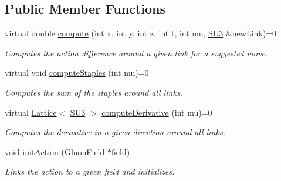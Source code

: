 \subsection*{Public Member Functions}
\begin{DoxyCompactItemize}
\item 
virtual double \hyperlink{classAction_ac0ea0d66e3ee4c7bdf0b478e613e5981}{compute} (int x, int y, int z, int t, int mu, \hyperlink{structSU3}{S\+U3} \&new\+Link)=0\hypertarget{classAction_ac0ea0d66e3ee4c7bdf0b478e613e5981}{}\label{classAction_ac0ea0d66e3ee4c7bdf0b478e613e5981}

\begin{DoxyCompactList}\small\item\em Computes the action difference around a given link for a suggested move. \end{DoxyCompactList}\item 
virtual void \hyperlink{classAction_ad6c5003169695d5cba0f69580040db50}{compute\+Staples} (int mu)=0\hypertarget{classAction_ad6c5003169695d5cba0f69580040db50}{}\label{classAction_ad6c5003169695d5cba0f69580040db50}

\begin{DoxyCompactList}\small\item\em Computes the sum of the staples around all links. \end{DoxyCompactList}\item 
virtual \hyperlink{classLattice}{Lattice}$<$ \hyperlink{structSU3}{S\+U3} $>$ \hyperlink{classAction_a722e4f88dda82440d0c6e19a43972b21}{compute\+Derivative} (int mu)=0\hypertarget{classAction_a722e4f88dda82440d0c6e19a43972b21}{}\label{classAction_a722e4f88dda82440d0c6e19a43972b21}

\begin{DoxyCompactList}\small\item\em Computes the derivative in a given direction around all links. \end{DoxyCompactList}\item 
void \hyperlink{classAction_a3c4e7cbcf64ae134fa86afd5d156b12b}{init\+Action} (\hyperlink{field_8h_afe80b127697eba6d6e7fbd8121c8d4ee}{Gluon\+Field} $\ast$field)
\begin{DoxyCompactList}\small\item\em Links the action to a given field and initializes. \end{DoxyCompactList}\end{DoxyCompactItemize}
